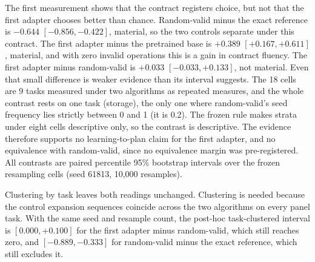 The first measurement shows that the contract registers choice, but not that the first adapter chooses better than chance. Random-valid minus the exact reference is $-0.644$ $[-0.856, -0.422]$, material, so the two controls separate under this contract. The first adapter minus the pretrained base is $+0.389$ $[+0.167, +0.611]$, material, and with zero invalid operations this is a gain in contract fluency. The first adapter minus random-valid is $+0.033$ $[-0.033, +0.133]$, not material. Even that small difference is weaker evidence than its interval suggests. The 18 cells are 9 tasks measured under two algorithms as repeated measures, and the whole contrast rests on one task (storage), the only one where random-valid's seed frequency lies strictly between 0 and 1 (it is 0.2). The frozen rule makes strata under eight cells descriptive only, so the contrast is descriptive. The evidence therefore supports no learning-to-plan claim for the first adapter, and no equivalence with random-valid, since no equivalence margin was pre-registered. All contrasts are paired percentile 95\% bootstrap intervals over the frozen resampling cells (seed 61813, 10,000 resamples).

Clustering by task leaves both readings unchanged. Clustering is needed because the control expansion sequences coincide across the two algorithms on every panel task. With the same seed and resample count, the post-hoc task-clustered interval is $[0.000, +0.100]$ for the first adapter minus random-valid, which still reaches zero, and $[-0.889, -0.333]$ for random-valid minus the exact reference, which still excludes it.

